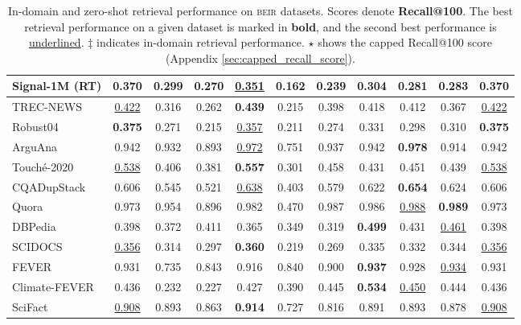 \documentclass{article}
\newcommand{\custo}[1]{\textsc{\normalsize #1}}
\newcommand{\beir}{\custo{beir}\xspace}
\begin{document}
\begin{table}[t!]
{\begin{tabular}{l | c | c c c | c c c c | c | c}
   Signal-1M (RT)& \textbf{0.370} & 0.299 & 0.270 & \underline{0.351} & 0.162 & 0.239 & 0.304 & 0.281 & 0.283 & \textbf{0.370} \\ \midrule
   TREC-NEWS     & \underline{0.422} & 0.316 & 0.262 & \textbf{0.439} & 0.215 & 0.398 & 0.418 & 0.412 & 0.367 & \underline{0.422} \\
   Robust04      & \textbf{0.375} & 0.271 & 0.215 & \underline{0.357} & 0.211 & 0.274 & 0.331 & 0.298 & 0.310 & \textbf{0.375} \\ \midrule
   ArguAna       & 0.942 & 0.932 & 0.893 & \underline{0.972} & 0.751 & 0.937 & 0.942 & \textbf{0.978} & 0.914 & 0.942 \\  
   Touch\'e-2020 & \underline{0.538} & 0.406 & 0.381 & \textbf{0.557} & 0.301 & 0.458 & 0.431 & 0.451 & 0.439 & \underline{0.538} \\ \midrule 
   CQADupStack   & 0.606 & 0.545 & 0.521 & \underline{0.638} & 0.403 & 0.579 & 0.622 & \textbf{0.654} & 0.624 & 0.606 \\
   Quora         & 0.973 & 0.954 & 0.896 & 0.982 & 0.470 & 0.987 & 0.986 & \underline{0.988} & \textbf{0.989} & 0.973 \\ \midrule
   DBPedia       & 0.398 & 0.372 & 0.411 & 0.365 & 0.349 & 0.319 & \textbf{0.499} & 0.431 & \underline{0.461} & 0.398 \\ \midrule
   SCIDOCS       & \underline{0.356} & 0.314 & 0.297 & \textbf{0.360} & 0.219 & 0.269 & 0.335 & 0.332 & 0.344 & \underline{0.356} \\ \midrule
   FEVER         & 0.931 & 0.735 & 0.843 & 0.916 & 0.840 & 0.900 & \textbf{0.937} & 0.928 & \underline{0.934} & 0.931 \\ 
   Climate-FEVER & 0.436 & 0.232 & 0.227 & 0.427 & 0.390 & 0.445 & \textbf{0.534} & \underline{0.450} & 0.444 & 0.436 \\  
   SciFact       & \underline{0.908} & 0.893 & 0.863 & \textbf{0.914} & 0.727 & 0.816 & 0.891 & 0.893 & 0.878 & \underline{0.908} \\
    \bottomrule
    \end{tabular}}
    \caption{In-domain and zero-shot retrieval performance on \beir datasets. Scores denote \textbf{Recall@100}. The best retrieval performance on a given dataset is marked in \textbf{bold}, and the second best performance is \underline{underlined}. $\ddagger$ indicates in-domain retrieval performance. $\star$ shows the capped Recall@100 score (Appendix \ref{sec:capped_recall_score}). \vspace{-5mm}}
    \label{tab:results-recall}
\end{table}
\end{document}
